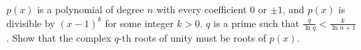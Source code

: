 \(p(x)\) is a polynomial of degree \(n\) with every coefficient \(0 \) or \(\pm1\), and \(p(x)\) is divisible by \( (x - 1)^k\) for some integer \( k > 0\). \(q\) is a prime such that \(\frac{q}{\ln q}< \frac{k}{\ln n+1}\). Show that the complex \(q\)-th roots of unity must be roots of \( p(x). \)